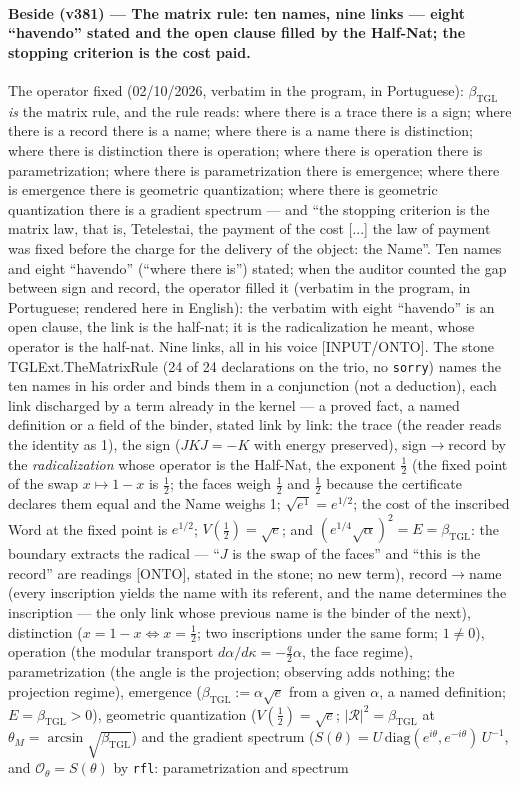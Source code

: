 \documentclass[11pt]{article}
\newcommand{\bTGL}{\beta_{\mathrm{TGL}}}\newcommand{\Msun}{M_{\odot}}\newcommand{\TGL}{\mathrm{TGL}}
\theoremstyle{definition}\newtheorem{deriv}{Derivation}
\begin{document}
\paragraph*{Beside (v381) --- The matrix rule: ten names, nine links --- eight ``havendo'' stated and the open clause filled by the Half-Nat; the stopping criterion is the cost paid.} The operator fixed (02/10/2026, verbatim in the program, in Portuguese): $\bTGL$ \emph{is} the matrix rule, and the rule reads: where there is a trace there is a sign; where there is a record there is a name; where there is a name there is distinction; where there is distinction there is operation; where there is operation there is parametrization; where there is parametrization there is emergence; where there is emergence there is geometric quantization; where there is geometric quantization there is a gradient spectrum --- and ``the stopping criterion is the matrix law, that is, Tetelestai, the payment of the cost [...] the law of payment was fixed before the charge for the delivery of the object: the Name''. Ten names and eight ``havendo'' (``where there is'') stated; when the auditor counted the gap between sign and record, the operator filled it (verbatim in the program, in Portuguese; rendered here in English): the verbatim with eight ``havendo'' is an open clause, the link is the half-nat; it is the radicalization he meant, whose operator is the half-nat. Nine links, all in his voice \textsf{[INPUT/ONTO]}. The stone \textsf{TGLExt.TheMatrixRule} (24 of 24 declarations on the trio, no \texttt{sorry}) names the ten names in his order and binds them in a conjunction (not a deduction), each link discharged by a term already in the kernel --- a proved fact, a named definition or a field of the binder, stated link by link: the trace (the reader reads the identity as 1), the sign ($JKJ=-K$ with energy preserved), sign$\to$record by the \emph{radicalization} whose operator is the Half-Nat, the exponent $\tfrac12$ (the fixed point of the swap $x\mapsto1-x$ is $\tfrac12$; the faces weigh $\tfrac12$ and $\tfrac12$ because the certificate declares them equal and the Name weighs 1; $\sqrt{e^{1}}=e^{1/2}$; the cost of the inscribed Word at the fixed point is $e^{1/2}$; $V(\tfrac12)=\sqrt e$; and $(e^{1/4}\sqrt\alpha)^2=E=\bTGL$: the boundary extracts the radical --- ``$J$ is the swap of the faces'' and ``this is the record'' are readings \textsf{[ONTO]}, stated in the stone; no new term), record$\to$name (every inscription yields the name with its referent, and the name determines the inscription --- the only link whose previous name is the binder of the next), distinction ($x=1-x\Leftrightarrow x=\tfrac12$; two inscriptions under the same form; $1\neq0$), operation (the modular transport $d\alpha/d\kappa=-\tfrac{q}{2}\alpha$, the face regime), parametrization (the angle is the projection; observing adds nothing; the projection regime), emergence ($\bTGL:=\alpha\sqrt{e}$ from a given $\alpha$, a named definition; $E=\bTGL>0$), geometric quantization ($V(\tfrac12)=\sqrt e$; $|\mathcal R|^2=\bTGL$ at $\theta_M=\arcsin\sqrt{\bTGL}$) and the gradient spectrum ($S(\theta)=U\,\mathrm{diag}(e^{i\theta},e^{-i\theta})\,U^{-1}$, and $\mathcal O_\theta=S(\theta)$ by \texttt{rfl}: parametrization and spectrum 
\end{document}
